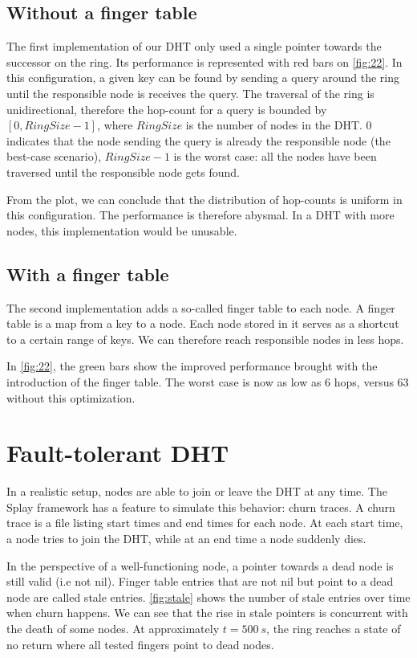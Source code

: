 \documentclass[11pt,a4paper]{scrartcl}
\begin{document}
\subsection{Without a finger table}

The first implementation of our DHT only used a single pointer towards the successor on the ring.
Its performance is represented with red bars on \autoref{fig:22}.
In this configuration, a given key can be found by sending a query around the ring until the responsible node is receives the query.
The traversal of the ring is unidirectional, therefore the hop-count for a query is bounded by $\left[0,RingSize-1\right]$, where $RingSize$ is the number of nodes in the DHT.
$0$ indicates that the node sending the query is already the responsible node (the best-case scenario), $RingSize-1$ is the worst case: all the nodes have been traversed until the responsible node gets found.

From the plot, we can conclude that the distribution of hop-counts is uniform in this configuration.
The performance is therefore abysmal.
In a DHT with more nodes, this implementation would be unusable.

\subsection{With a finger table}

The second implementation adds a so-called finger table to each node.
A finger table is a map from a key to a node.
Each node stored in it serves as a shortcut to a certain range of keys.
We can therefore reach responsible nodes in less hops.

In \autoref{fig:22}, the green bars show the improved performance brought with the introduction of the finger table.
The worst case is now as low as 6 hops, versus 63 without this optimization.

\section{Fault-tolerant DHT}

In a realistic setup, nodes are able to join or leave the DHT at any time.
The Splay framework has a feature to simulate this behavior: churn traces.
A churn trace is a file listing start times and end times for each node.
At each start time, a node tries to join the DHT, while at an end time a node suddenly dies.

In the perspective of a well-functioning node, a pointer towards a dead node is still valid (i.e not \textsf{nil}).
Finger table entries that are not \textsf{nil} but point to a dead node are called stale entries.
\autoref{fig:stale} shows the number of stale entries over time when churn happens.
We can see that the rise in stale pointers is concurrent with the death of some nodes.
At approximately $t=\SI{500}{s}$, the ring reaches a state of no return where all tested fingers point to dead nodes.
\end{document}
